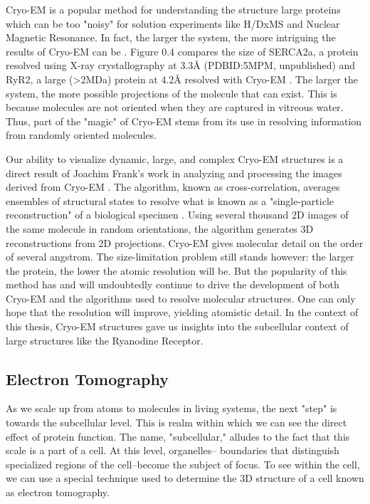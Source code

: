 \documentclass[12pt]{ucsddissertation}
\begin{document}
\begin{dissertationintroduction}
Cryo-EM is a popular method for understanding the structure large proteins which can be too "noisy" for solution experiments like H/DxMS and Nuclear Magnetic Resonance\cite{Ishima2000}. In fact, the larger the system, the more intriguing the results of Cryo-EM can be \cite{Frank1995,Lee2015,Sevvana2018}. Figure 0.4 compares the size of SERCA2a, a protein resolved using X-ray crystallography at 3.3\si{\angstrom} (PDBID:5MPM, unpublished) and RyR2, a large (>2MDa) protein at 4.2\si{\angstrom} resolved with Cryo-EM \cite{Peng2016}. The larger the system, the more possible projections of the molecule that can exist. This is because molecules are not oriented when they are captured in vitreous water. Thus, part of the "magic" of Cryo-EM stems from its use in resolving information from randomly oriented molecules. 

Our ability to visualize dynamic, large, and complex Cryo-EM structures is a direct result of Joachim Frank's work in analyzing and processing the images derived from Cryo-EM \cite{Frank1970}. The algorithm, known as cross-correlation, averages ensembles of structural states to resolve what is known as a "single-particle reconstruction" of a biological specimen \cite{Saxton1976}. Using several thousand 2D images of the same molecule in random orientations, the algorithm generates 3D reconstructions from 2D projections\cite{Frank2009}. 
Cryo-EM gives molecular detail on the order of several \si{angstrom}. The size-limitation problem still stands however: the larger the protein, the lower the atomic resolution will be. But the popularity of this method has and will undoubtedly continue to drive the development of both Cryo-EM and the algorithms used to resolve molecular structures. One can only hope that the resolution will improve, yielding atomistic detail. In the context of this thesis, Cryo-EM structures gave us insights into the subcellular context of large structures like the Ryanodine Receptor.  

\subsection{Electron Tomography}
As we scale up from atoms to molecules in living systems, the next "step" is towards the subcellular level. This is realm within which we can see the direct effect of protein function. The name, "subcellular," alludes to the fact that this scale is a part of a cell. At this level, organelles-- boundaries that distinguish specialized regions of the cell--become the subject of focus. To see within the cell, we can use a special technique used to determine the 3D structure of a cell known as electron tomography. 


\end{dissertationintroduction}
\end{document}
